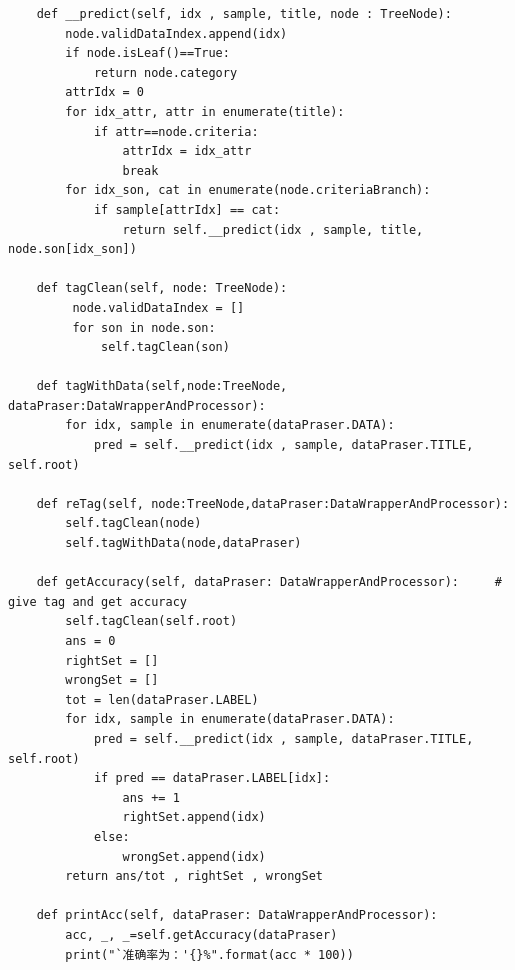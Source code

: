 \documentclass{ctexart}
\begin{document}
\begin{lstlisting}
    def __predict(self, idx , sample, title, node : TreeNode):
        node.validDataIndex.append(idx)
        if node.isLeaf()==True:
            return node.category
        attrIdx = 0
        for idx_attr, attr in enumerate(title):
            if attr==node.criteria:
                attrIdx = idx_attr
                break
        for idx_son, cat in enumerate(node.criteriaBranch):
            if sample[attrIdx] == cat:
                return self.__predict(idx , sample, title, node.son[idx_son])
    
    def tagClean(self, node: TreeNode):
         node.validDataIndex = []
         for son in node.son:
             self.tagClean(son)
    
    def tagWithData(self,node:TreeNode, dataPraser:DataWrapperAndProcessor):
        for idx, sample in enumerate(dataPraser.DATA):
            pred = self.__predict(idx , sample, dataPraser.TITLE, self.root)
    
    def reTag(self, node:TreeNode,dataPraser:DataWrapperAndProcessor):
        self.tagClean(node)
        self.tagWithData(node,dataPraser)
    
    def getAccuracy(self, dataPraser: DataWrapperAndProcessor):     # give tag and get accuracy
        self.tagClean(self.root)
        ans = 0
        rightSet = []
        wrongSet = []
        tot = len(dataPraser.LABEL)
        for idx, sample in enumerate(dataPraser.DATA):
            pred = self.__predict(idx , sample, dataPraser.TITLE, self.root)
            if pred == dataPraser.LABEL[idx]:
                ans += 1
                rightSet.append(idx)
            else:
                wrongSet.append(idx)
        return ans/tot , rightSet , wrongSet
    
    def printAcc(self, dataPraser: DataWrapperAndProcessor):
        acc, _, _=self.getAccuracy(dataPraser)
        print("`准确率为：'{}%".format(acc * 100))


\end{lstlisting}
\end{document}
